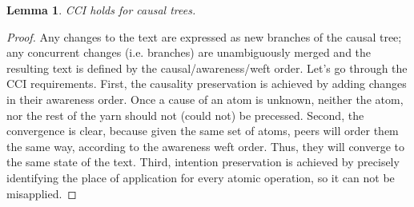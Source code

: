 \documentclass{sig-alternate}
\newtheorem{lemma}{Lemma}
\begin{document}
\begin{lemma}
CCI holds for causal trees. 
\end{lemma}
\begin{proof}
Any changes to the text are expressed as new branches  of the causal tree; any concurrent changes (i.e. branches) are unambiguously merged and the resulting text is defined by the causal/awareness/weft order.
Let's go through the CCI requirements.
First, the causality preservation is achieved by adding changes in their awareness order. Once a cause of an atom is unknown, neither the atom, nor the rest of the yarn should not (could not) be precessed.
Second, the convergence is clear, because given the same set of atoms, peers will order them the same way, according to the awareness weft order. Thus, they will converge to the same state of the text.
Third, intention preservation is achieved by precisely identifying the place of application for every atomic operation, so it can not be misapplied.
\end{proof}
\end{document}
